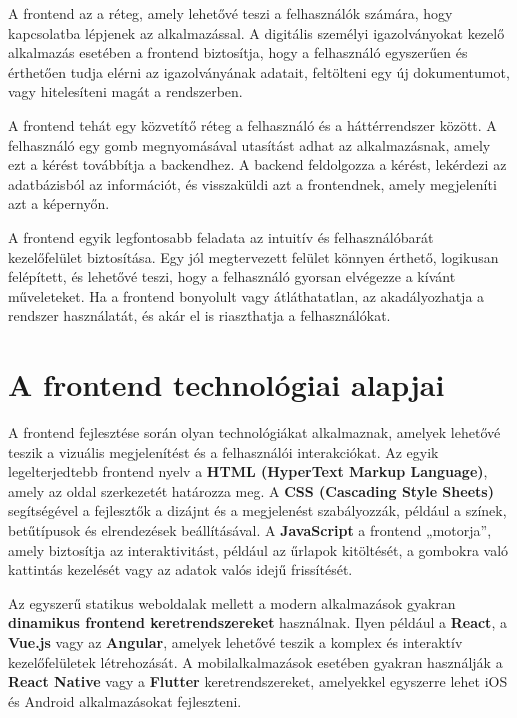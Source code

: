 \documentclass[
]{thesis-ekf}
\theoremstyle{definition}
\theoremstyle{remark}
\begin{document}
	A frontend az a réteg, amely lehetővé teszi a felhasználók számára, hogy kapcsolatba lépjenek az alkalmazással. A digitális személyi igazolványokat kezelő alkalmazás esetében a frontend biztosítja, hogy a felhasználó egyszerűen és érthetően tudja elérni az igazolványának adatait, feltölteni egy új dokumentumot, vagy hitelesíteni magát a rendszerben.
	
	A frontend tehát egy közvetítő réteg a felhasználó és a háttérrendszer között. A felhasználó egy gomb megnyomásával utasítást adhat az alkalmazásnak, amely ezt a kérést továbbítja a backendhez. A backend feldolgozza a kérést, lekérdezi az adatbázisból az információt, és visszaküldi azt a frontendnek, amely megjeleníti azt a képernyőn.
	
	A frontend egyik legfontosabb feladata az intuitív és felhasználóbarát kezelőfelület biztosítása. Egy jól megtervezett felület könnyen érthető, logikusan felépített, és lehetővé teszi, hogy a felhasználó gyorsan elvégezze a kívánt műveleteket. Ha a frontend bonyolult vagy átláthatatlan, az akadályozhatja a rendszer használatát, és akár el is riaszthatja a felhasználókat.
	
	\section{A frontend technológiai alapjai}
	
	A frontend fejlesztése során olyan technológiákat alkalmaznak, amelyek lehetővé teszik a vizuális megjelenítést és a felhasználói interakciókat. Az egyik legelterjedtebb frontend nyelv a \textbf{HTML (HyperText Markup Language)}, amely az oldal szerkezetét határozza meg. A \textbf{CSS (Cascading Style Sheets)} segítségével a fejlesztők a dizájnt és a megjelenést szabályozzák, például a színek, betűtípusok és elrendezések beállításával. A \textbf{JavaScript} a frontend „motorja”, amely biztosítja az interaktivitást, például az űrlapok kitöltését, a gombokra való kattintás kezelését vagy az adatok valós idejű frissítését.
	
	Az egyszerű statikus weboldalak mellett a modern alkalmazások gyakran \textbf{dinamikus frontend keretrendszereket} használnak. Ilyen például a \textbf{React}, a \textbf{Vue.js} vagy az \textbf{Angular}, amelyek lehetővé teszik a komplex és interaktív kezelőfelületek létrehozását. A mobilalkalmazások esetében gyakran használják a \textbf{React Native} vagy a \textbf{Flutter} keretrendszereket, amelyekkel egyszerre lehet iOS és Android alkalmazásokat fejleszteni.
	
\end{document}
